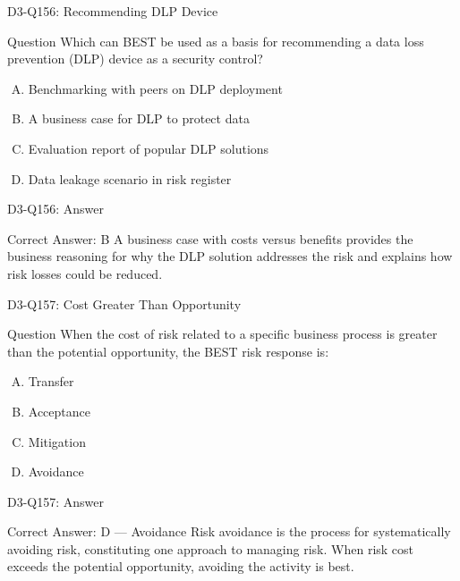 \documentclass{beamer}
\begin{document}
	\begin{frame}{D3-Q156: Recommending DLP Device}
		\begin{block}{Question}
			Which can BEST be used as a basis for recommending a data loss prevention (DLP) device as a security control?
		\end{block}
		\begin{enumerate}[(A)]
			\item Benchmarking with peers on DLP deployment
			\item A business case for DLP to protect data
			\item Evaluation report of popular DLP solutions
			\item Data leakage scenario in risk register
		\end{enumerate}
	\end{frame}
	\begin{frame}{D3-Q156: Answer}
		\begin{block}{Correct Answer: B}
			A business case with costs versus benefits provides the business reasoning for why the DLP solution addresses the risk and explains how risk losses could be reduced.
		\end{block}
	\end{frame}
	
	\begin{frame}{D3-Q157: Cost Greater Than Opportunity}
		\begin{block}{Question}
			When the cost of risk related to a specific business process is greater than the potential opportunity, the BEST risk response is:
		\end{block}
		\begin{enumerate}[(A)]
			\item Transfer
			\item Acceptance
			\item Mitigation
			\item Avoidance
		\end{enumerate}
	\end{frame}
	\begin{frame}{D3-Q157: Answer}
		\begin{block}{Correct Answer: D --- Avoidance}
			Risk avoidance is the process for systematically avoiding risk, constituting one approach to managing risk. When risk cost exceeds the potential opportunity, avoiding the activity is best.
		\end{block}
	\end{frame}
	
\end{document}
